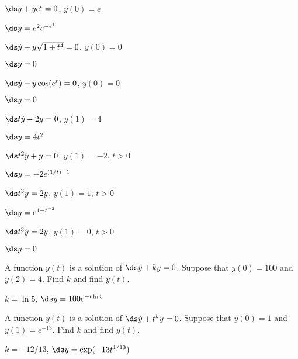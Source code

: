 \begin{exercises}
\begin{exercise} $\ds\dot y +ye^t=0$, $y(0)=e$
\begin{answer} $\ds y=e^2e^{-e^t}$
\end{answer}\end{exercise}

\begin{exercise} $\ds\dot y +y\sqrt{1+t^4}=0$, $y(0)=0$
\begin{answer} $\ds y=0$
\end{answer}\end{exercise}

\begin{exercise} $\ds\dot y + y\cos(e^t)=0$, $y(0)=0$
\begin{answer} $\ds y=0$
\end{answer}\end{exercise}

\begin{exercise} $\ds t\dot y - 2y = 0$, $y(1)=4$
\begin{answer} $\ds y=4t^2$
\end{answer}\end{exercise}

\begin{exercise} $\ds t^2\dot y + y = 0$, $y(1)=-2$, $t>0$
\begin{answer} $\ds y=-2e^{(1/t)-1}$
\end{answer}\end{exercise}

\begin{exercise} $\ds t^3\dot y = 2y$, $y(1)=1$, $t>0$
\begin{answer} $\ds y=e^{1-t^{-2}}$
\end{answer}\end{exercise}

\begin{exercise} $\ds t^3\dot y = 2y$, $y(1)=0$, $t>0$
\begin{answer} $\ds y=0$
\end{answer}\end{exercise}


\begin{exercise} A function $y(t)$ is a solution of $\ds\dot y +
ky=0$. Suppose that $y(0)=100$ and $y(2)=4$. Find $k$ and find $y(t)$.
\begin{answer} $k=\ln 5$, $\ds y=100e^{-t\ln 5}$
\end{answer}\end{exercise}

\begin{exercise} A function $y(t)$ is a solution of $\ds\dot y +
t^ky=0$. Suppose that $y(0)=1$ and $y(1)=e^{-13}$. Find $k$ and find
$y(t)$. 
\begin{answer} $k=-12/13$, $\ds y=\exp(-13 t^{1/13})$
\end{answer}\end{exercise}


\end{exercises}
